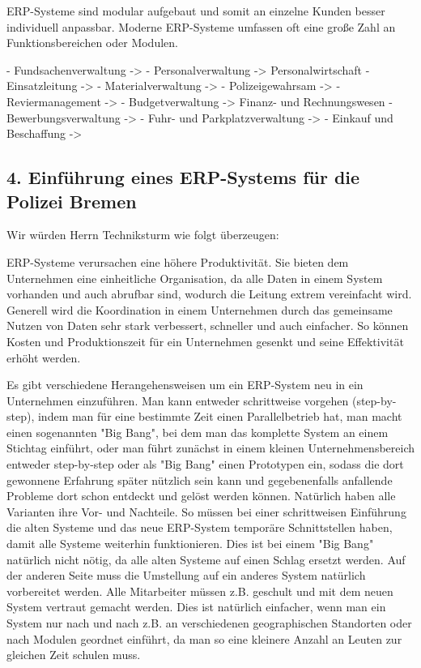 \documentclass[12pt,utf8]{scrartcl}
\begin{document}
ERP-Systeme sind modular aufgebaut und somit an einzelne Kunden besser individuell anpassbar. Moderne ERP-Systeme umfassen oft eine große Zahl an Funktionsbereichen oder Modulen. 

- Fundsachenverwaltung -> 
- Personalverwaltung -> Personalwirtschaft
- Einsatzleitung -> 
- Materialverwaltung -> 
- Polizeigewahrsam -> 
- Reviermanagement -> 
- Budgetverwaltung -> Finanz- und Rechnungswesen
- Bewerbungsverwaltung -> 
- Fuhr- und Parkplatzverwaltung -> 
- Einkauf und Beschaffung -> 

\newpage
\subsection*{4. Einführung eines ERP-Systems für die Polizei Bremen}

Wir würden Herrn Techniksturm wie folgt überzeugen:

ERP-Systeme verursachen eine höhere Produktivität. Sie bieten dem Unternehmen eine einheitliche Organisation, da alle Daten in einem System vorhanden und auch abrufbar sind, wodurch die Leitung extrem vereinfacht wird. Generell wird die Koordination in einem Unternehmen durch das gemeinsame Nutzen von Daten sehr stark verbessert, schneller und auch einfacher. So können Kosten und Produktionszeit für ein Unternehmen gesenkt und seine Effektivität erhöht werden\cite{Nwankpa2015}.

Es gibt verschiedene Herangehensweisen um ein ERP-System neu in ein Unternehmen einzuführen. Man kann entweder schrittweise vorgehen (step-by-step), indem man für eine bestimmte Zeit einen Parallelbetrieb hat, man macht einen sogenannten "Big Bang", bei dem man das komplette System an einem Stichtag einführt, oder man führt zunächst in einem kleinen Unternehmensbereich entweder step-by-step oder als "Big Bang" einen Prototypen ein, sodass die dort gewonnene Erfahrung später nützlich sein kann und gegebenenfalls anfallende Probleme dort schon entdeckt und gelöst werden können. Natürlich haben alle Varianten ihre Vor- und Nachteile. So müssen bei einer schrittweisen Einführung die alten Systeme und das neue ERP-System temporäre Schnittstellen haben, damit alle Systeme weiterhin funktionieren. Dies ist bei einem "Big Bang" natürlich nicht nötig, da alle alten Systeme auf einen Schlag ersetzt werden. Auf der anderen Seite muss die Umstellung auf ein anderes System natürlich vorbereitet werden. Alle Mitarbeiter müssen z.B. geschult und mit dem neuen System vertraut gemacht werden. Dies ist natürlich einfacher, wenn man ein System nur nach und nach z.B. an verschiedenen geographischen Standorten oder nach Modulen geordnet einführt, da man so eine kleinere Anzahl an Leuten zur gleichen Zeit schulen muss\cite{Jacob2008}. 
\end{document}
